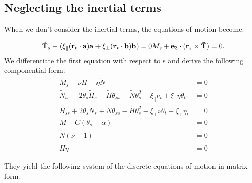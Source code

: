 
\subsection{Neglecting the inertial terms}
When we don't consider the inertial terms, the equations of motion become:

\[ \tilde{\mathbf{T}}_s - (\xi_\parallel (\mathbf{r}_t\cdot\mathbf{a})\mathbf{a} + \xi_\perp (\mathbf{r}_t\cdot\mathbf{b})\mathbf{b}) = 0\\

M_s + \mathbf{e}_3 \cdot(\mathbf{r}_s \times \mathbf{\tilde{T}}) = 0.
\]
We differentiate the first equation with respect to s and derive the following componential form:
\begin{align}
M_s + \nu \tilde{H} -\eta \tilde{N} 
&= 0\\
\tilde{N}_{ss} - 2\theta_s\tilde{H}_s - \tilde{H}\theta_{ss}- \tilde{N}\theta_s^2
- \xi_{\parallel}\nu_t + \xi_{\parallel}\eta\theta_t &= 0\\
\tilde{H}_{ss} + 2\theta_s\tilde{N}_s + \tilde{N}\theta_{ss} - \tilde{H}\theta_s^2  - \xi_{\perp}\nu\theta_t - \xi_{\perp}\eta_t
&= 0\\
M - C(\theta_s -\alpha)  &= 0\\
\tilde{N}(\nu - 1) &= 0\\
\tilde{H}\eta &= 0
\end{align}

They yield the following system of the discrete equations of motion in matrix form:

